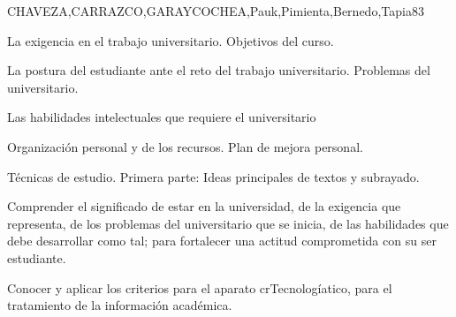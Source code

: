 \begin{syllabus}
\begin{outcomes}
\end{outcomes}

\begin{unit}{}{CHAVEZA,CARRAZCO,GARAYCOCHEA,Pauk,Pimienta,Bernedo,Tapia}{8}{3}
\begin{topics}
        \item La exigencia en el trabajo universitario. Objetivos del curso.
        \item La postura del estudiante ante el reto del trabajo universitario. Problemas  del universitario.     
        \item Las  habilidades intelectuales que requiere el universitario
        \item Organización personal y de los recursos. Plan de mejora personal.
        \item Técnicas de estudio. Primera parte: Ideas principales de textos y subrayado.       
\end{topics}
\begin{unitgoals}
        \item Comprender el  significado de estar en  la universidad, de la exigencia que representa, de los problemas del universitario que se inicia, de las habilidades que debe desarrollar como tal; para fortalecer una actitud comprometida con su ser estudiante.
        \item Conocer y aplicar los criterios para el aparato crTecnologíatico, para el tratamiento de la información académica.
\end{unitgoals}
\end{unit}


\end{syllabus}
